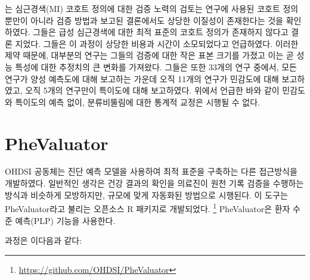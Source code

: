 \documentclass[10.5pt]{book}
\let\rmarkdownfootnote\footnote%
\def\footnote{\protect\rmarkdownfootnote}
\theoremstyle{definition}
\theoremstyle{definition}
\theoremstyle{definition}
\theoremstyle{remark}
\begin{document}
\citet{Rubbo2015phenotypes} 는 심근경색(MI) 코호트 정의에 대한 검증
노력의 검토는 연구에 사용된 코호트 정의뿐만이 아니라 검증 방법과 보고된
결론에서도 상당한 이질성이 존재한다는 것을 확인하였다. 그들은 급성
심근경색에 대한 최적 표준의 코호트 정의가 존재하지 않다고 결론 지었다.
그들은 이 과정이 상당한 비용과 시간이 소모되었다고 언급하였다. 이러한
제약 때문에, 대부분의 연구는 그들의 검증에 대한 작은 표본 크기를 가졌고
이는 곧 성능 특성에 대한 추정치의 큰 변화를 가져왔다. 그들은 또한 33개의
연구 중에서, 모든 연구가 양성 예측도에 대해 보고하는 가운데 오직 11개의
연구가 민감도에 대해 보고하였고, 오직 5개의 연구만이 특이도에 대해
보고하였다. 위에서 언급한 바와 같이 민감도와 특이도의 예측 없이,
분류비뚤림에 대한 통계적 교정은 시행될 수 없다.

\section{PheValuator}\label{phevaluator}


OHDSI 공동체는 진단 예측 모델을 사용하여 최적 표준을 구축하는 다른
접근방식을 개발하였다. \citep{Swerdel2019phevaluator} 일반적인 생각은
건강 결과의 확인을 의료진이 원천 기록 검증을 수행하는 방식과 비슷하게
모방하지만, 규모에 맞게 자동화된 방법으로 시행된다. 이 도구는
PheValuator라고 불리는 오픈소스 R 패키지로 개발되었다. \footnote{\url{https://github.com/OHDSI/PheValuator}}
PheValuator은 환자 수준 예측(PLP) 기능을 사용한다.

과정은 이다음과 같다:
\end{document}
